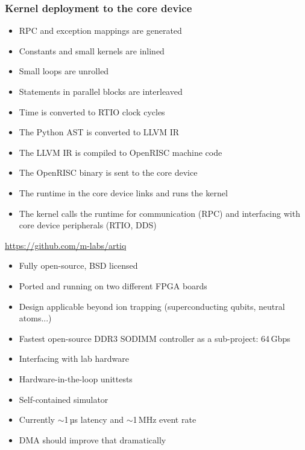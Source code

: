 \documentclass[final,presentation,compress]{beamer}
\begin{document}
\begin{frame}
  \frametitle{Kernel deployment to the core device}
  \footnotesize
  \begin{itemize}
    \item RPC and exception mappings are generated
    \item Constants and small kernels are inlined
    \item Small loops are unrolled
    \item Statements in parallel blocks are interleaved
    \item Time is converted to RTIO clock cycles
    \item The Python AST is converted to LLVM IR
    \item The LLVM IR is compiled to OpenRISC machine code
    \item The OpenRISC binary is sent to the core device
    \item The runtime in the core device links and runs the kernel
    \item The kernel calls the runtime for communication (RPC) and interfacing
      with core device peripherals (RTIO, DDS)
  \end{itemize}
\end{frame}


\begin{frame}
  \begin{center}
  \url{https://github.com/m-labs/artiq}
  \end{center}

  \footnotesize
  \begin{itemize}
    \item Fully open-source, BSD licensed
    \item Ported and running on two different FPGA boards
    \item Design applicable beyond ion trapping (superconducting qubits,
      neutral atoms...)
    \item Fastest open-source DDR3 SODIMM controller as a sub-project: 64\,Gbps
    \item Interfacing with lab hardware
    \item Hardware-in-the-loop unittests
    \item Self-contained simulator
    \item Currently $\sim$1\,µs latency and $\sim$1\,MHz event rate
    \item DMA should improve that dramatically
  \end{itemize}

\end{frame}
\end{document}
